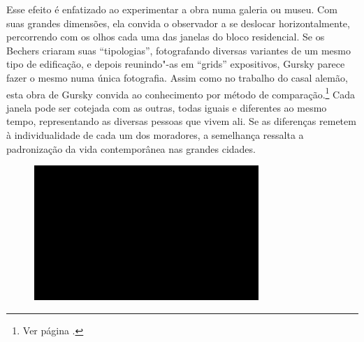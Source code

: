 Esse efeito é enfatizado ao experimentar a obra numa galeria ou museu.
Com suas grandes dimensões, ela convida o observador a se deslocar
horizontalmente, percorrendo com os olhos cada uma das janelas do bloco
residencial. Se os Bechers criaram suas ``tipologias'', fotografando
diversas variantes de um mesmo tipo de edificação, e depois reunindo"-as
em ``grids'' expositivos, Gursky parece fazer o mesmo numa única
fotografia. Assim como no trabalho do casal alemão, esta obra de Gursky
convida ao conhecimento por método de comparação.\footnote{Ver página
  .} Cada janela pode ser cotejada com as outras, todas iguais e
diferentes ao mesmo tempo, representando as diversas pessoas que vivem
ali. Se as diferenças remetem à individualidade de cada um dos
moradores, a semelhança ressalta a padronização da vida contemporânea
nas grandes cidades.

\begin{figure}[!ht]
\centering
 \includegraphics[width=85mm]{./imgs/im1.jpg}
\caption{\tiny{}}
\end{figure}

